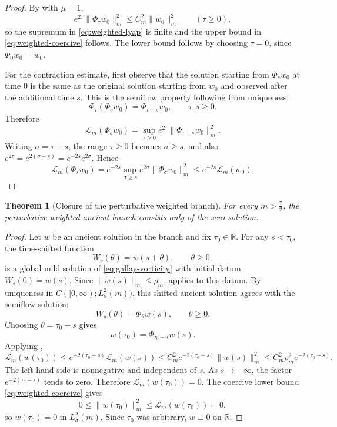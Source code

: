 \documentclass[11pt]{amsart}
\theoremstyle{plain}
\newtheorem{theorem}{Theorem}[section]
\theoremstyle{definition}
\theoremstyle{remark}
\numberwithin{equation}{section}
\begin{document}
\begin{proof}
By  with \(\mu=1\),
\[
   e^{2\tau}\|\Phi_\tau w_0\|_m^2
   \le
   C_m^2\|w_0\|_m^2
   \qquad(\tau\ge0),
\]
so the supremum in \eqref{eq:weighted-lyap} is finite and the upper bound in
\eqref{eq:weighted-coercive} follows.  The lower bound follows by choosing
\(\tau=0\), since \(\Phi_0w_0=w_0\).

For the contraction estimate, first observe that the solution starting from
\(\Phi_sw_0\) at time \(0\) is the same as the original solution starting from
\(w_0\) and observed after the additional time \(s\).  This is the
semiflow property following from uniqueness:
\[
   \Phi_\tau(\Phi_sw_0)=\Phi_{\tau+s}w_0,\qquad \tau,s\ge0.
\]
Therefore
\[
   \mathcal L_m(\Phi_s w_0)
   =
   \sup_{\tau\ge0}e^{2\tau}\|\Phi_{\tau+s}w_0\|_m^2 .
\]
Writing \(\sigma=\tau+s\), the range \(\tau\ge0\) becomes \(\sigma\ge s\), and
also \(e^{2\tau}=e^{2(\sigma-s)}=e^{-2s}e^{2\sigma}\).  Hence
\[
   \mathcal L_m(\Phi_s w_0)
   =
   e^{-2s}\sup_{\sigma\ge s}e^{2\sigma}\|\Phi_\sigma w_0\|_m^2
   \le
   e^{-2s}\mathcal L_m(w_0).
\]
\end{proof}

\begin{theorem}[Closure of the perturbative weighted branch]\label{thm:weighted-closed}
For every \(m>\frac72\), the perturbative weighted ancient branch consists
only of the zero solution.
\end{theorem}

\begin{proof}
Let \(w\) be an ancient solution in the branch and fix \(\tau_0\in\mathbb R\).
For any \(s<\tau_0\), the time-shifted function
\[
   W_s(\theta)=w(s+\theta),\qquad \theta\ge0,
\]
is a global mild solution of \eqref{eq:gallay-vorticity} with initial datum
\(W_s(0)=w(s)\).  Since \(\|w(s)\|_m\le\rho_m\),  applies to
this datum.  By uniqueness in
\(C([0,\infty);L^2_\sigma(m))\), this shifted ancient solution agrees with the
semiflow solution:
\[
   W_s(\theta)=\Phi_\theta w(s),\qquad \theta\ge0.
\]
Choosing \(\theta=\tau_0-s\) gives
\[
   w(\tau_0)=\Phi_{\tau_0-s}w(s).
\]
Applying ,
\[
   \mathcal L_m(w(\tau_0))
   \le
   e^{-2(\tau_0-s)}\mathcal L_m(w(s))
   \le
   C_m^2 e^{-2(\tau_0-s)}\|w(s)\|_m^2
   \le
   C_m^2\rho_m^2 e^{-2(\tau_0-s)} .
\]
The left-hand side is nonnegative and independent of \(s\).  As
\(s\to-\infty\), the factor \(e^{-2(\tau_0-s)}\) tends to zero.  Therefore
\(\mathcal L_m(w(\tau_0))=0\).  The coercive lower bound
\eqref{eq:weighted-coercive} gives
\[
   0\le \|w(\tau_0)\|_m^2\le \mathcal L_m(w(\tau_0))=0,
\]
so \(w(\tau_0)=0\) in \(L^2_\sigma(m)\).  Since \(\tau_0\) was arbitrary,
\(w\equiv0\) on \(\mathbb R\).
\end{proof}
\end{document}
